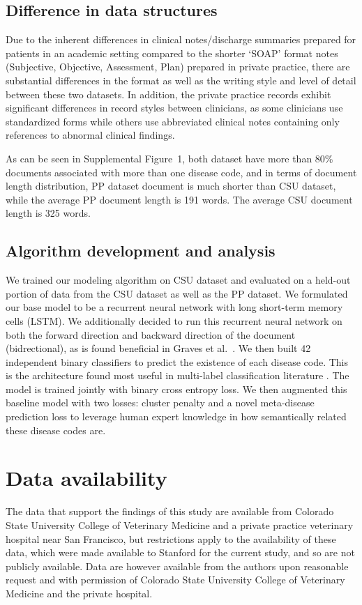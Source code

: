 \documentclass{article}[11pt,oneside]
\begin{document}
\subsection*{Difference in data structures}
Due to the inherent differences in clinical notes/discharge summaries prepared for patients in an academic setting compared to the shorter `SOAP' format notes (Subjective, Objective, Assessment, Plan) prepared in private practice, there are substantial differences in the format as well as the writing style and level of detail between these two datasets. In addition, the private practice records exhibit significant differences in record styles between clinicians, as some clinicians use standardized forms while others use abbreviated clinical notes containing only references to abnormal clinical findings. 

As can be seen in Supplemental Figure~1, both dataset have more than 80\% documents associated with more than one disease code, and in terms of document length distribution, PP dataset document is much shorter than CSU dataset, while the average PP document length is 191 words. The average CSU document length is 325 words.

\subsection*{Algorithm development and analysis}

We trained our modeling algorithm on CSU dataset and evaluated on a held-out portion of data from the CSU dataset as well as the PP dataset. 
We formulated our base model to be a recurrent neural network with long short-term memory cells (LSTM). We additionally decided to run this recurrent neural network on both the forward direction and backward direction of the document (bidrectional), as is found beneficial in Graves et al.~\cite{graves2005bidirectional}. We then built 42 independent binary classifiers to predict the existence of each disease code. This is the architecture found most useful in multi-label classification literature \cite{kavuluru2015empirical}. The model is trained jointly with binary cross entropy loss. We then augmented this baseline model with two losses: cluster penalty \cite{jacob2009clustered} and a novel meta-disease prediction loss to leverage human expert knowledge in how semantically related these disease codes are.

\section*{Data availability}
The data that support the findings of this study are available from Colorado State University College of Veterinary Medicine and a private practice veterinary hospital near San Francisco, but restrictions apply to the availability of these data,
which were made available to Stanford for the current study, and so are not publicly available. Data are however available from the authors upon
reasonable request and with permission of Colorado State University College of Veterinary Medicine and the private hospital.
\end{document}
